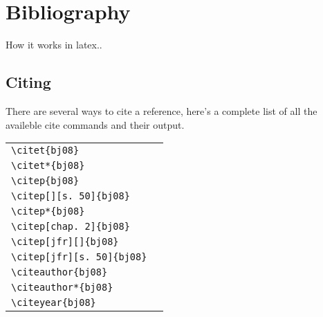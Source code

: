 \section{Bibliography}

How it works in latex..

\subsection{Citing}

There are several ways to cite a reference, here's a complete list of all the
availeble cite commands and their output.

\begin{tabular}{l l}
\verb+\citet{bj08}+ & \citet{bj08} \\
\verb+\citet*{bj08}+ & \citet*{bj08} \\
\verb+\citep{bj08}+ & \citep{bj08} \\
\verb+\citep[][s. 50]{bj08}+ & \citep[][s. 50]{bj08} \\
\verb+\citep*{bj08}+ & \citep*{bj08} \\
\verb+\citep[chap. 2]{bj08}+ & \citep[chap. 2]{bj08} \\
\verb+\citep[jfr][]{bj08}+ & \citep[jfr][]{bj08} \\
\verb+\citep[jfr][s. 50]{bj08}+ & \citep[jfr][s. 50]{bj08} \\
\verb+\citeauthor{bj08}+ & \citeauthor{bj08} \\
\verb+\citeauthor*{bj08}+ & \citeauthor*{bj08} \\
\verb+\citeyear{bj08}+ & \citeyear{bj08}
\end{tabular}

